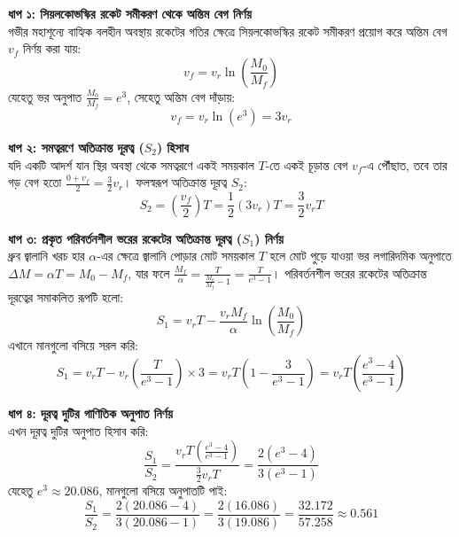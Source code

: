 \documentclass[12pt, a4paper]{article}
\begin{document}
\begin{tcolorbox}[solutionbox={সমাধান (Solution)}]
\noindent
\textbf{ধাপ ১: সিয়লকোভস্কির রকেট সমীকরণ থেকে অন্তিম বেগ নির্ণয়} \\
গভীর মহাশূন্যে বাহ্যিক বলহীন অবস্থায় রকেটের গতির ক্ষেত্রে সিয়লকোভস্কির রকেট সমীকরণ প্রয়োগ করে অন্তিম বেগ $v_f$ নির্ণয় করা যায়:
\[ v_f = v_r \ln\left(\frac{M_0}{M_f}\right) \]
যেহেতু ভর অনুপাত $\frac{M_0}{M_f} = e^3$, সেহেতু অন্তিম বেগ দাঁড়ায়:
\[ v_f = v_r \ln(e^3) = 3 v_r \]

\vspace{0.5em}
\noindent
\textbf{ধাপ ২: সমত্বরণে অতিক্রান্ত দূরত্ব ($S_2$) হিসাব} \\
যদি একটি আদর্শ যান স্থির অবস্থা থেকে সমত্বরণে একই সময়কাল $T$-তে একই চূড়ান্ত বেগ $v_f$-এ পৌঁছাত, তবে তার গড় বেগ হতো $\frac{0 + v_f}{2} = \frac{3}{2} v_r$। ফলস্বরূপ অতিক্রান্ত দূরত্ব $S_2$:
\[ S_2 = \left(\frac{v_f}{2}\right) T = \frac{1}{2} (3 v_r) T = \frac{3}{2} v_r T \]

\vspace{0.5em}
\noindent
\textbf{ধাপ ৩: প্রকৃত পরিবর্তনশীল ভরের রকেটের অতিক্রান্ত দূরত্ব ($S_1$) নির্ণয়} \\
ধ্রুব জ্বালানি খরচ হার $\alpha$-এর ক্ষেত্রে জ্বালানি পোড়ার মোট সময়কাল $T$ হলে মোট পুড়ে যাওয়া ভর লগারিদমিক অনুপাতে $\Delta M = \alpha T = M_0 - M_f$, যার ফলে $\frac{M_f}{\alpha} = \frac{T}{\frac{M_0}{M_f} - 1} = \frac{T}{e^3 - 1}$। পরিবর্তনশীল ভরের রকেটের অতিক্রান্ত দূরত্বের সমাকলিত রূপটি হলো:
\[ S_1 = v_r T - \frac{v_r M_f}{\alpha} \ln\left(\frac{M_0}{M_f}\right) \]
এখানে মানগুলো বসিয়ে সরল করি:
\[ S_1 = v_r T - v_r \left(\frac{T}{e^3 - 1}\right) \times 3 = v_r T \left(1 - \frac{3}{e^3 - 1}\right) = v_r T \left(\frac{e^3 - 4}{e^3 - 1}\right) \]

\vspace{0.5em}
\noindent
\textbf{ধাপ ৪: দূরত্ব দুটির গাণিতিক অনুপাত নির্ণয়} \\
এখন দূরত্ব দুটির অনুপাত হিসাব করি:
\[ \frac{S_1}{S_2} = \frac{v_r T \left(\frac{e^3 - 4}{e^3 - 1}\right)}{\frac{3}{2} v_r T} = \frac{2(e^3 - 4)}{3(e^3 - 1)} \]
যেহেতু $e^3 \approx 20.086$, মানগুলো বসিয়ে অনুপাতটি পাই:
\[ \frac{S_1}{S_2} = \frac{2(20.086 - 4)}{3(20.086 - 1)} = \frac{2(16.086)}{3(19.086)} = \frac{32.172}{57.258} \approx 0.561 \]
\end{tcolorbox}

\newpage
\end{document}
